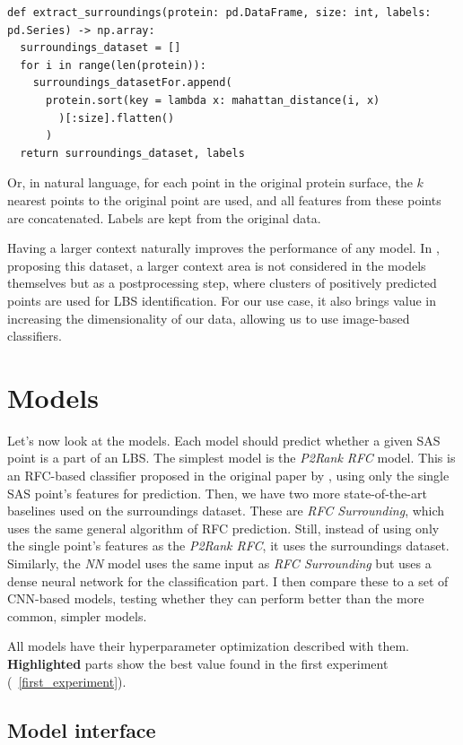 \begin{lstlisting}
def extract_surroundings(protein: pd.DataFrame, size: int, labels: pd.Series) -> np.array:
  surroundings_dataset = []
  for i in range(len(protein)):
    surroundings_datasetFor.append(
      protein.sort(key = lambda x: mahattan_distance(i, x)
        )[:size].flatten()
      )
  return surroundings_dataset, labels
\end{lstlisting}

Or, in natural language, for each point in the original protein surface, the $k$ nearest points to the original point are used, and all features from these points are concatenated. Labels are kept from the original data.

Having a larger context naturally improves the performance of any model. In \cite{P2RANK}, proposing this dataset, a larger context area is not considered in the models themselves but as a postprocessing step, where clusters of positively predicted points are used for \ac{LBS} identification. For our use case, it also brings value in increasing the dimensionality of our data, allowing us to use image-based classifiers.

\section{Models}

Let's now look at the models. Each model should predict whether a given \ac{SAS} point is a part of an \ac{LBS}. The simplest model is the \textit{P2Rank RFC} model. This is an RFC-based classifier proposed in the original paper by \cite{P2RANK}, using only the single SAS point's features for prediction. Then, we have two more state-of-the-art baselines used on the surroundings dataset. These are \textit{RFC Surrounding}, which uses the same general algorithm of RFC prediction. Still, instead of using only the single point's features as the \textit{P2Rank RFC}, it uses the surroundings dataset. Similarly, the \textit{NN} model uses the same input as \textit{RFC Surrounding} but uses a dense neural network for the classification part. I then compare these to a set of CNN-based models, testing whether they can perform better than the more common, simpler models.

All models have their hyperparameter optimization described with them. \textbf{Highlighted} parts show the best value found in the first experiment (~\ref{first_experiment}).

\subsection{Model interface}

